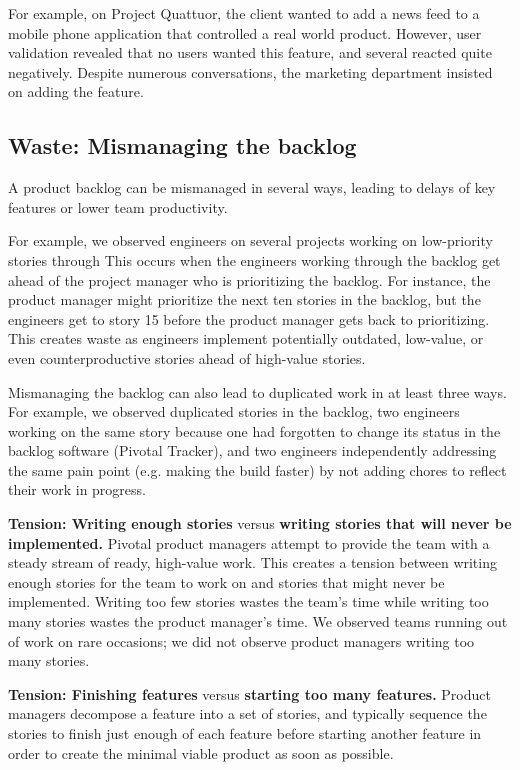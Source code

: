 For example, on Project Quattuor, the client wanted to add a news feed to a mobile phone application that controlled a real world product. However, user validation revealed that no users wanted this feature, and several reacted quite negatively. Despite numerous conversations, the marketing department insisted on adding the feature. 
\subsection{Waste: Mismanaging the backlog}
A product backlog can be mismanaged in several ways, leading to delays of key features or lower team productivity. 

For example, we observed engineers on several projects working on low-priority stories through  This occurs when the engineers working through the backlog get ahead of the project manager who is prioritizing the backlog. For instance, the product manager might prioritize the next ten stories in the backlog, but the engineers get to story 15 before the product manager gets back to prioritizing. This creates waste as engineers implement potentially outdated, low-value, or even counterproductive stories ahead of high-value stories.   

Mismanaging the backlog can also lead to duplicated work in at least three ways. For example, we observed duplicated stories in the backlog, two engineers working on the same story because one had forgotten to change its status in the backlog software (Pivotal Tracker), and two engineers independently addressing the same pain point (e.g. making the build faster) by not adding chores to reflect their work in progress.

\textbf{Tension: Writing enough stories} versus \textbf{writing stories that will never be implemented.}
Pivotal product managers attempt to provide the team with a steady stream of ready, high-value work. This creates a tension between writing enough stories for the team to work on and  stories that might never be implemented. Writing too few stories wastes the team's time while writing too many stories wastes the product manager's time. We observed teams running out of work on rare occasions; we did not observe product managers writing too many stories.  

\textbf{Tension: Finishing features} versus \textbf{starting too many features.}
Product managers decompose a feature into a set of stories, and typically sequence the stories to finish just enough of each feature before starting another feature in order to create the minimal viable product as soon as possible. 

